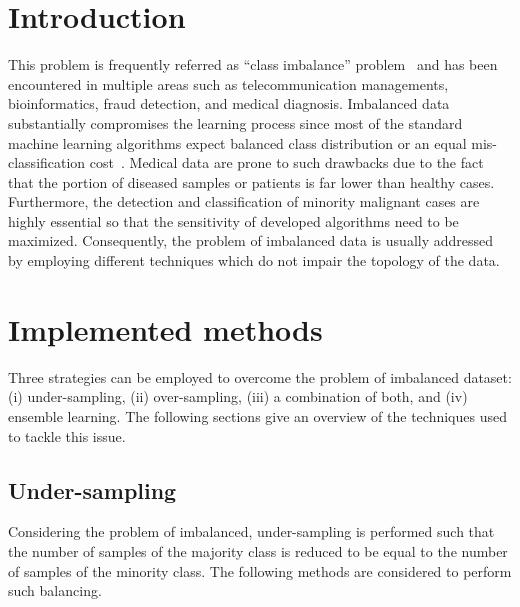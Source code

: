 \documentclass[twoside,11pt]{article}
\begin{document}
\section{Introduction}

This problem is frequently referred as ``class imbalance'' problem~\cite{prati2009data} and has been encountered in multiple areas such as telecommunication managements, bioinformatics, fraud detection, and medical diagnosis. 
Imbalanced data substantially compromises the learning process since most of the standard machine learning algorithms expect balanced class distribution or an equal mis-classification cost~\cite{he2009learning}.
Medical data are prone to such drawbacks due to the fact that the portion of diseased samples or patients is far lower than healthy cases.
Furthermore, the detection and classification of minority malignant cases are highly essential so that the sensitivity of developed algorithms need to be maximized.
Consequently, the problem of imbalanced data is usually addressed by employing different techniques which do not impair the topology of the data.

\section{Implemented methods}

Three strategies can be employed to overcome the problem of imbalanced dataset: (i) under-sampling, (ii) over-sampling, (iii) a combination of both, and (iv) ensemble learning.
The following sections give an overview of the techniques used to tackle this issue.

\subsection{Under-sampling}

Considering the problem of imbalanced, under-sampling is performed such that the number of samples of the majority class is reduced to be equal to the number of samples of the minority class.
The following methods are considered to perform such balancing.
\end{document}

